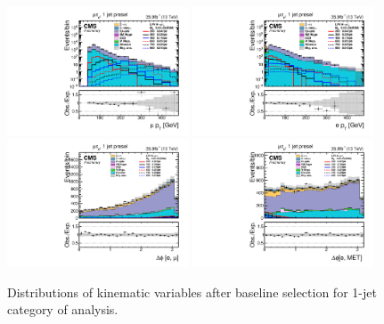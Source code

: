 \begin{figure}[htbp]
     \centering
     \includegraphics[width=0.48\textwidth]{plots_and_figures/chapter5/preselection_HM/log_mutaue_1jet_presel_mPt.pdf}
     \includegraphics[width=0.48\textwidth]{plots_and_figures/chapter5/preselection_HM/log_mutaue_1jet_presel_ePt.pdf}\\
     \includegraphics[width=0.48\textwidth]{plots_and_figures/chapter5/preselection_HM/mutaue_1jet_presel_dphiemu.pdf}
     \includegraphics[width=0.48\textwidth]{plots_and_figures/chapter5/preselection_HM/mutaue_1jet_presel_dphiEMet.pdf}\\
     \caption{Distributions of kinematic variables after baseline selection for 1-jet category of \Hmue analysis.}
     \label{fig:Hmutaue_presel2}
\end{figure}


